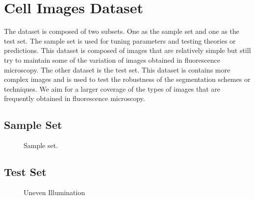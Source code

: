 
\chapter{Cell Images Dataset} %

\label{AppendixA} %

The dataset is composed of two subsets. One as the sample set and one as the test set. The sample set is used for tuning parameters and testing theories or predictions. This dataset is composed of images that are relatively simple but still try to maintain some of the variation of images obtained in fluorescence microscopy. The other dataset is the test set. This dataset is contains more complex images and is used to test the robustness of the segmentation schemes or techniques. We aim for a larger coverage of the types of images that are frequently obtained in fluorescence microscopy.

\section{Sample Set}
\begin{figure}[!h]
	\centering
	\caption{Sample set.}
	\label{fig:sampleset}
\end{figure}

\section{Test Set}

\begin{figure}[!h]
	\centering
	\caption{Uneven Illumination}
	\label{fig:unevenillumination}
\end{figure}

